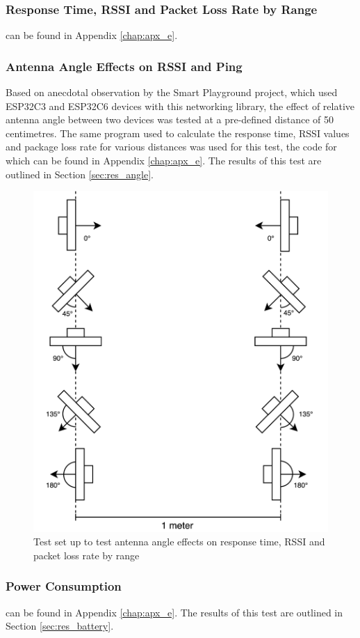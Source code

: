 \subsubsection{\label{sec:methods_test_rssi}Response Time, RSSI and Packet Loss Rate by Range}
can be found in Appendix \ref{chap:apx_e}.

\subsubsection{\label{sec:methods_test_angle}Antenna Angle Effects on RSSI and Ping}
Based on anecdotal observation by the Smart Playground project, which used ESP32C3 and ESP32C6 devices with this networking library, the effect of relative antenna angle between two devices was tested at a pre-defined distance of 50 centimetres. The same program used to calculate the response time, RSSI values and package loss rate for various distances was used for this test, the code for which can be found in Appendix \ref{chap:apx_e}. The results of this test are outlined in Section \ref{sec:res_angle}.

\begin{figure}[H]
    \centering
    \includegraphics[width=0.5\linewidth]{overleaf/images/angletest.drawio.png}
    \vspace{\ftspace}
    \caption{Test set up to test antenna angle effects on response time, RSSI and packet loss rate by range}
    \label{fig:angle}
\end{figure}

\subsubsection{\label{sec:methods_test_batter}Power Consumption}

can be found in Appendix \ref{chap:apx_e}. The results of this test are outlined in Section \ref{sec:res_battery}.

